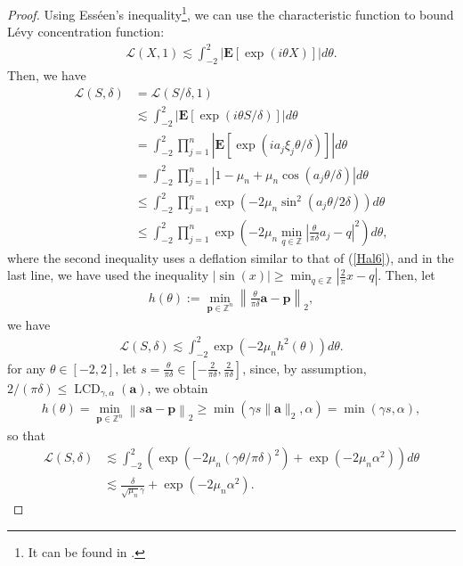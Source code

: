 \documentclass{article}
\numberwithin{equation}{section}
\theoremstyle{plain}
\begin{document}
\begin{proof}
Using Ess\'{e}en's inequality\footnote{It can be found in \cite{MR205297}.}, we can use the characteristic function to bound L\'{e}vy concentration function:
\begin{align*}
\mathcal{L}(X, 1) \lesssim \int_{-2}^2|\textbf{E}[\exp (i \theta X)]| d \theta.
\end{align*}
Then, we have
\begin{align*}
\mathcal{L}(S, \delta) & =\mathcal{L}(S / \delta, 1) \\
& \lesssim \int_{-2}^2|\textbf{E}[\exp (i \theta S / \delta)]| d \theta \\
& =\int_{-2}^2 \prod_{j=1}^n\left|\textbf{E}\left[\exp \left(i a_j \xi_j \theta / \delta\right)\right]\right| d \theta \\
& =\int_{-2}^2 \prod_{j=1}^n\left|1-\mu_{n}+\mu_{n}\cos \left(a_j \theta / \delta\right)\right| d \theta \\
& \leq \int_{-2}^2 \prod_{j=1}^n \exp \left(-2\mu_{n}\sin ^2\left(a_j \theta / 2\delta\right)\right) d \theta \\
& \leq \int_{-2}^2 \prod_{j=1}^n \exp \left(-2\mu_{n} \min _{q \in \mathbb{Z}}\left|\frac{ \theta}{\pi \delta} a_j-q\right|^2\right) d \theta,
\end{align*}
where the second inequality uses a deflation similar to that of (\ref{Hal6}), and in the last line, we have used the inequality $|\sin (x)| \geq \min _{q \in \mathbb{Z}}\left|\frac{2}{\pi} x-q\right|$. Then, let
\begin{align*}
h(\theta):=\min _{\boldsymbol{p} \in \mathbb{Z}^n}\left\|\frac{ \theta}{\pi \delta} \boldsymbol{a}-\boldsymbol{p}\right\|_2,
\end{align*}
we have
\begin{align*}
\mathcal{L}(S, \delta) \lesssim \int_{-2}^2 \exp \left(-2\mu_{n} h^2(\theta)\right) d \theta.
\end{align*}
for any $\theta \in[-2,2]$, let $s=\frac{\theta}{\pi\delta}\in[-\frac{2}{\pi\delta},\frac{2}{\pi\delta}]$, since, by assumption, $2 /(\pi \delta) \leq \operatorname{LCD}_{\gamma, \alpha}(\boldsymbol{a})$, we obtain
\begin{align*}
h(\theta)= \min _{\boldsymbol{p} \in \mathbb{Z}^n}\left\|s \boldsymbol{a}-\boldsymbol{p}\right\|_2\geq \min \left(\gamma s\|\boldsymbol{a}\|_2, \alpha\right)=\min \left(\gamma s, \alpha\right),
\end{align*}
so that
\begin{align*}
\mathcal{L}(S, \delta) & \lesssim \int_{-2}^2\left(\exp \left(-2\mu_{n}( \gamma \theta / \pi \delta)^2\right)+\exp \left(-2\mu_{n}\alpha^2\right)\right) d \theta \\
& \lesssim \frac{\delta}{\sqrt{\mu_{n}}\gamma}+\exp \left(-2\mu_{n}\alpha^2\right).
\end{align*}
\end{proof}
\end{document}
